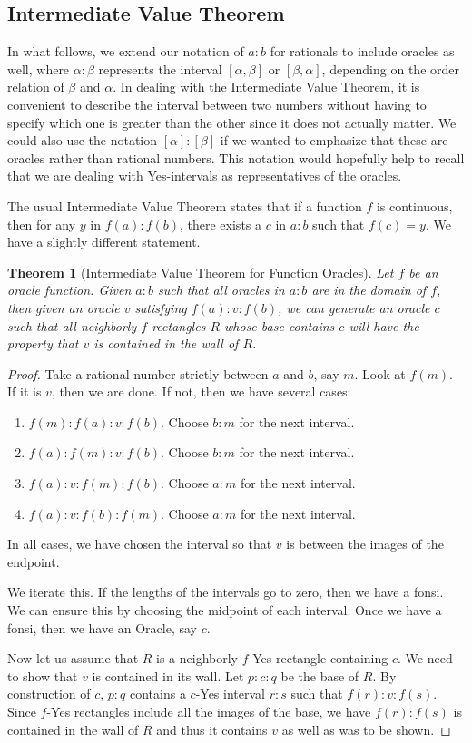 \documentclass[12pt]{article}
\newtheorem{theorem}{Theorem}[section]
\begin{document}
\subsection{Intermediate Value Theorem}

In what follows, we extend our notation of $a:b$ for rationals to include oracles as well, where $\alpha : \beta$ represents the interval $[\alpha,\beta]$ or $[\beta, \alpha]$, depending on the order relation of $\beta$ and $\alpha$. In dealing with the Intermediate Value Theorem, it is convenient to describe the interval between two numbers without having to specify which one is greater than the other since it does not actually matter. We could also use the notation $[\alpha]:[\beta]$ if we wanted to emphasize that these are oracles rather than rational numbers. This notation would hopefully help to recall that we are dealing with Yes-intervals as representatives of the oracles.

The usual Intermediate Value Theorem states that if a function $f$ is continuous, then for any $y$ in $f(a):f(b)$, there exists a $c$ in $a:b$ such that $f(c) = y$. We have a slightly different statement.

\begin{theorem}[Intermediate Value Theorem for Function Oracles]
Let $f$ be an oracle function. Given $a:b$ such that all oracles in $a:b$ are in the domain of $f$, then given an oracle $v$ satisfying $f(a):v:f(b)$, we can generate an oracle $c$ such that all neighborly $f$ rectangles $R$ whose base contains $c$ will have the property that $v$ is contained in the wall of $R$.
\end{theorem}

\begin{proof}
Take a rational number strictly between $a$ and $b$, say $m$. Look at $f(m)$. If it is $v$, then we are done. If not, then we have several cases: 
\begin{enumerate}
\item $f(m):f(a):v:f(b)$. Choose $b:m$ for the next interval.
\item $f(a):f(m):v:f(b)$. Choose $b:m$ for the next interval. 
\item $f(a):v:f(m):f(b)$. Choose $a:m$ for the next interval.
\item $f(a):v:f(b):f(m)$. Choose $a:m$ for the next interval. 
\end{enumerate}
In all cases, we have chosen the interval so that $v$ is between the images of the endpoint. 

We iterate this. If the lengths of the intervals go to zero, then we have a fonsi. We can ensure this by choosing the midpoint of each interval. Once we have a fonsi, then we have an Oracle, say $c$. 

Now let us assume that $R$ is a neighborly $f$-Yes rectangle containing $c$. We need to show that $v$ is contained in its wall. Let $p:c:q$ be the base of $R$. By construction of $c$, $p:q$ contains a $c$-Yes interval $r:s$ such that $f(r):v:f(s)$. Since $f$-Yes rectangles include all the images of the base, we have $f(r):f(s)$ is contained in the wall of $R$ and thus it contains $v$ as well as was to be shown. 
\end{proof}
\end{document}
